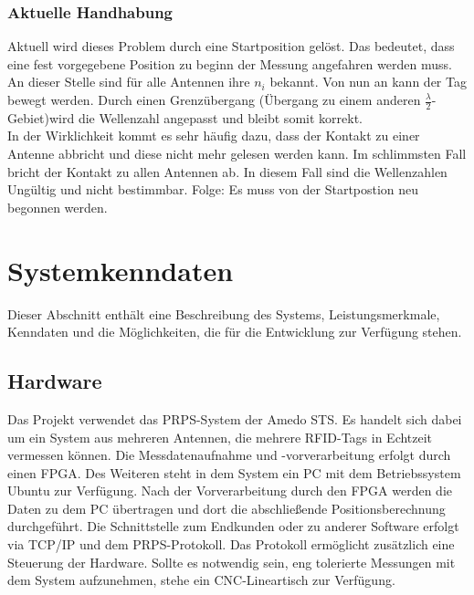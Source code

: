 \documentclass[a4paper,12pt,fleqn]{article}
\begin{document}
\subsubsection{Aktuelle Handhabung}
%
Aktuell wird dieses Problem durch eine Startposition gelöst. Das bedeutet, dass eine fest vorgegebene Position zu beginn der Messung angefahren werden muss. An dieser Stelle sind für alle Antennen ihre $n_i$ bekannt. Von nun an kann der Tag bewegt werden. Durch einen Grenzübergang (Übergang zu einem anderen $\frac{\lambda}{2}$-Gebiet)wird die Wellenzahl angepasst und bleibt somit korrekt.\\
In der Wirklichkeit kommt es sehr häufig dazu, dass der Kontakt zu einer Antenne abbricht und diese nicht mehr gelesen werden kann. Im schlimmsten Fall bricht der Kontakt zu allen Antennen ab. In diesem Fall sind die Wellenzahlen Ungültig und nicht bestimmbar. Folge: Es muss von der Startpostion neu begonnen werden.
%
\section{Systemkenndaten}
Dieser Abschnitt enthält eine Beschreibung des Systems, Leistungsmerkmale, Kenndaten und die Möglichkeiten, die für die Entwicklung zur Verfügung stehen.
%
\subsection{Hardware}
Das Projekt verwendet das PRPS-System der Amedo STS. Es handelt sich dabei um ein System aus mehreren Antennen, die mehrere RFID-Tags in Echtzeit vermessen können. Die Messdatenaufnahme und -vorverarbeitung erfolgt durch einen FPGA. Des Weiteren steht in dem System ein PC mit dem Betriebssystem Ubuntu zur Verfügung. Nach der Vorverarbeitung durch den FPGA werden die Daten zu dem PC übertragen und dort die abschließende Positionsberechnung durchgeführt. Die Schnittstelle zum Endkunden oder zu anderer Software erfolgt via TCP/IP und dem PRPS-Protokoll. Das Protokoll ermöglicht zusätzlich eine Steuerung der Hardware.
Sollte es notwendig sein, eng tolerierte Messungen mit dem System aufzunehmen, stehe ein CNC-Lineartisch zur Verfügung.
%
\end{document}
